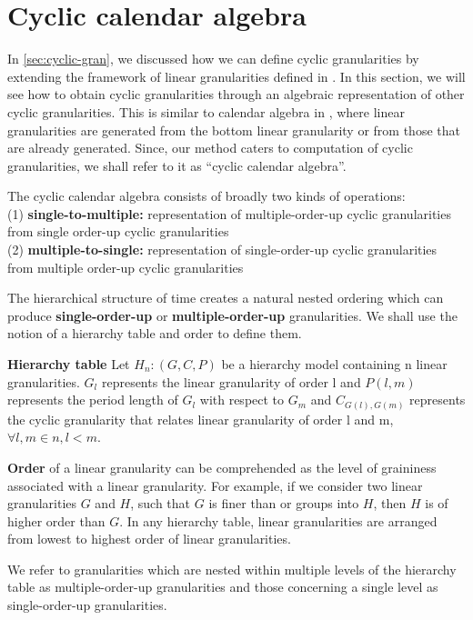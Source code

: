 \documentclass[12pt]{article}
\begin{document}
\hypertarget{sec:cyclic-calendar}{%
\section{Cyclic calendar algebra}\label{sec:cyclic-calendar}}

In \autoref{sec:cyclic-gran}, we discussed how we can define cyclic granularities by extending the framework of linear granularities defined in \citet{Bettini1998-ed}. In this section, we will see how to obtain cyclic granularities through an algebraic representation of other cyclic granularities. This is similar to calendar algebra in \citet{Ning2002-tf}, where linear granularities are generated from the bottom linear granularity or from those that are already generated. Since, our method caters to computation of cyclic granularities, we shall refer to it as ``cyclic calendar algebra''.

The cyclic calendar algebra consists of broadly two kinds of operations:\\
(1) \textbf{single-to-multiple:} representation of multiple-order-up cyclic granularities from single order-up cyclic granularities\\
(2) \textbf{multiple-to-single:} representation of single-order-up cyclic granularities from multiple order-up cyclic granularities

The hierarchical structure of time creates a natural nested ordering which can produce \textbf{single-order-up} or \textbf{multiple-order-up} granularities. We shall use the notion of a hierarchy table and order to define them.

\textbf{Hierarchy table} Let \(H_n: (G, C, P)\) be a hierarchy model containing n linear granularities. \(G_{l}\) represents the linear granularity of order l and \(P(l,m)\) represents the period length of \(G_{l}\) with respect to \(G_{m}\) and \(C_{G(l),G(m)}\) represents the cyclic granularity that relates linear granularity of order l and m, \(\forall l,m \in n, l<m\).

\textbf{Order} of a linear granularity can be comprehended as the level of graininess associated with a linear granularity. For example, if we consider two linear granularities \(G\) and \(H\), such that \(G\) is finer than or groups into \(H\), then \(H\) is of higher order than \(G\). In any hierarchy table, linear granularities are arranged from lowest to highest order of linear granularities.

We refer to granularities which are nested within multiple levels of the hierarchy table as multiple-order-up granularities and those concerning a single level as single-order-up granularities.
\end{document}
